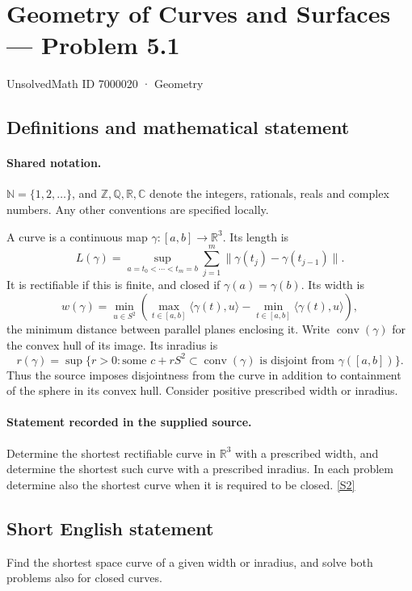\documentclass[11pt]{article}
\newcommand{\sref}[2]{\hyperlink{source:#1:#2}{[S#2]}}
\begin{document}
\setcounter{section}{7000019}
\section{Geometry of Curves and Surfaces — Problem 5.1}\label{7000020}
{\small\sffamily UnsolvedMath ID 7000020 · Geometry}
\subsection{Definitions and mathematical statement}

\paragraph{Shared notation.}$\mathbb N=\{1,2,\ldots\}$, and $\mathbb Z,\mathbb Q,\mathbb R,\mathbb C$ denote the integers, rationals, reals and complex numbers. Any other conventions are specified locally.


A curve is a continuous map $\gamma:[a,b]\to\mathbb R^3$. Its length is
\[L(\gamma)=\sup_{a=t_0<\cdots<t_m=b}\sum_{j=1}^m\lVert\gamma(t_j)-\gamma(t_{j-1})\rVert.\]
It is rectifiable if this is finite, and closed if $\gamma(a)=\gamma(b)$. Its width is
\[w(\gamma)=\min_{u\in S^2}\left(\max_{t\in[a,b]}\langle\gamma(t),u\rangle-\min_{t\in[a,b]}\langle\gamma(t),u\rangle\right),\]
the minimum distance between parallel planes enclosing it. Write $\operatorname{conv}(\gamma)$ for the convex hull of its image. Its inradius is
\[r(\gamma)=\sup\{r>0:\text{some }c+rS^2\subset\operatorname{conv}(\gamma)\text{ is disjoint from }\gamma([a,b])\}.\]
Thus the source imposes disjointness from the curve in addition to containment of the sphere in its convex hull. Consider positive prescribed width or inradius.
\paragraph{Statement recorded in the supplied source.}
Determine the shortest rectifiable curve in $\mathbb R^3$ with a prescribed width, and determine the shortest such curve with a prescribed inradius. In each problem determine also the shortest curve when it is required to be closed. \sref{7000020}{2}
\subsection{Short English statement}
Find the shortest space curve of a given width or inradius, and solve both problems also for closed curves.
\end{document}
